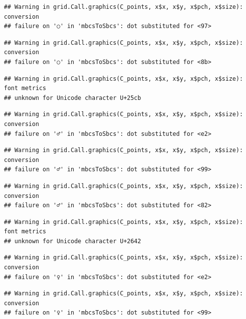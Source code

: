\documentclass[
]{book}
\begin{document}
\begin{verbatim}
## Warning in grid.Call.graphics(C_points, x$x, x$y, x$pch, x$size): conversion
## failure on '○' in 'mbcsToSbcs': dot substituted for <97>
\end{verbatim}

\begin{verbatim}
## Warning in grid.Call.graphics(C_points, x$x, x$y, x$pch, x$size): conversion
## failure on '○' in 'mbcsToSbcs': dot substituted for <8b>
\end{verbatim}

\begin{verbatim}
## Warning in grid.Call.graphics(C_points, x$x, x$y, x$pch, x$size): font metrics
## unknown for Unicode character U+25cb
\end{verbatim}

\begin{verbatim}
## Warning in grid.Call.graphics(C_points, x$x, x$y, x$pch, x$size): conversion
## failure on '♂' in 'mbcsToSbcs': dot substituted for <e2>
\end{verbatim}

\begin{verbatim}
## Warning in grid.Call.graphics(C_points, x$x, x$y, x$pch, x$size): conversion
## failure on '♂' in 'mbcsToSbcs': dot substituted for <99>
\end{verbatim}

\begin{verbatim}
## Warning in grid.Call.graphics(C_points, x$x, x$y, x$pch, x$size): conversion
## failure on '♂' in 'mbcsToSbcs': dot substituted for <82>
\end{verbatim}

\begin{verbatim}
## Warning in grid.Call.graphics(C_points, x$x, x$y, x$pch, x$size): font metrics
## unknown for Unicode character U+2642
\end{verbatim}

\begin{verbatim}
## Warning in grid.Call.graphics(C_points, x$x, x$y, x$pch, x$size): conversion
## failure on '♀' in 'mbcsToSbcs': dot substituted for <e2>
\end{verbatim}

\begin{verbatim}
## Warning in grid.Call.graphics(C_points, x$x, x$y, x$pch, x$size): conversion
## failure on '♀' in 'mbcsToSbcs': dot substituted for <99>
\end{verbatim}
\end{document}
